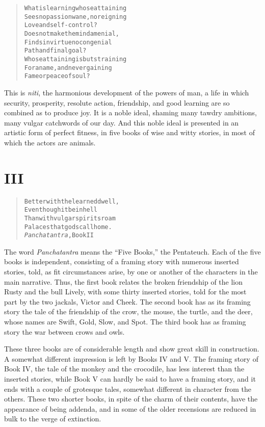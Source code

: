 \documentclass[article, twoside, 14pt]{memoir}
\renewenvironment{verbatim}{%
\begin{quote}%
\vskip -10pt%
\begin{alltt}\normalfont\large}{\end{alltt}%
\end{quote}%
\vskip -10pt
} %
\begin{document}
\begin{verbatim}
What is learning whose attaining
Sees no passion wane, no reigning
    Love and self-control?
Does not make the mind a menial,
Finds in virtue no congenial
    Path and final goal?
Whose attaining is but straining
For a name, and never gaining
    Fame or peace of soul?
\end{verbatim}
This is \emph{niti}, the harmonious development of the powers of
man, a life in which security, prosperity, resolute action,
friendship, and good learning are so combined as to produce joy. It
is a noble ideal, shaming many tawdry ambitions, many vulgar
catchwords of our day. And this noble ideal is presented in an
artistic form of perfect fitness, in five books of wise and witty
stories, in most of which the actors are animals.

\section{III}

\begin{verbatim}
Better with the learned dwell,
Even though it be in hell
Than with vulgar spirits roam
Palaces that gods call home.
        {\textemdash}\emph{Panchatantra}, Book II
\end{verbatim}
The word \emph{Panchatantra} means the ``Five Books,'' the
Pentateuch. Each of the five books is independent, consisting of a
framing story with numerous inserted stories, told, as fit
circumstances arise, by one or another of the characters in the
main narrative. Thus, the first book relates the broken friendship
of the lion Rusty and the bull Lively, with some thirty inserted
stories, told for the most part by the two jackals, Victor and
Cheek. The second book has as its framing story the tale of the
friendship of the crow, the mouse, the turtle, and the deer, whose
names are Swift, Gold, Slow, and Spot. The third book has as
framing story the war between crows and owls.

These three books are of considerable length and show great skill
in construction. A somewhat different impression is left by Books
IV and V. The framing story of Book IV, the tale of the monkey and
the crocodile, has less interest than the inserted stories, while
Book V can hardly be said to have a framing story, and it ends with
a couple of grotesque tales, somewhat different in character from
the others. These two shorter books, in spite of the charm of their
contents, have the appearance of being addenda, and in some of the
older recensions are reduced in bulk to the verge of extinction.
\end{document}
